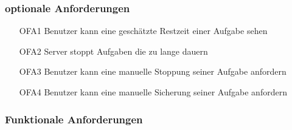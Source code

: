 \documentclass[a4paper,12pt]{article}
\begin{document}
\subsubsection{optionale Anforderungen}
\begin{itemize}[nosep]
\leftskip=0.5cm
\item[OFA1] Benutzer kann eine geschätzte Restzeit einer Aufgabe sehen	
\item[OFA2] Server stoppt Aufgaben die zu lange dauern %
\item[OFA3] Benutzer kann eine manuelle Stoppung seiner Aufgabe anfordern
\item[OFA4] Benutzer kann eine manuelle Sicherung seiner Aufgabe anfordern
\end{itemize}






\subsubsection{Funktionale Anforderungen}

\begin{comment}

\begin{minipage}[t]{\linewidth}
\item[FA00] \textbf{<Titel>}
\subitem \textbf{Erklärung} <In ca. 3 Zeilen eine grobe Beschreibung geben>
\subitem \textbf{Wichtigkeit} <entweder Kern-Funktionalität oder Optionale-Funktionalität> %
\subitem \textbf{Vorraussetzungen} <Wann ist diese Funktion nutzbar?> <dieser Punkt kann weggelassen werden> %
\subitem \textbf{Nachbedingung} <Dieser Punkt kann weggelassen werden>
\subsubitem \textbf{Erfolg} <Was geschieht wenn diese Funktion erfolgreich ausgeführt wurde>
\subsubitem \textbf{Misserfolg} <Was geschieht wenn diese Funktion nicht ausgeführt werden kann>
\subitem \textbf{Auslöser} <Wie wird diese Funktion gestartet> <Dieser Punkt kann weggelassen werden>
\subitem \textbf{Details} <Ausführliche Beschreibung dieser funktionalen Anforderung>
\end{minipage}
\pagebreak

\end{comment}
\end{document}
